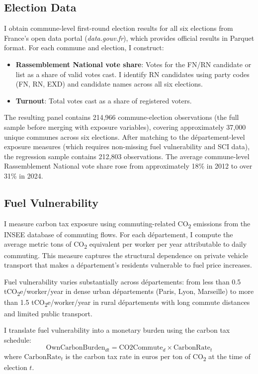 \documentclass[12pt]{article}
\newcommand{\rn}{Rassemblement National}
\newcommand{\dept}{d\'{e}partement}
\newcommand{\depts}{d\'{e}partements}
\begin{document}
\subsection{Election Data}

I obtain commune-level first-round election results for all six elections from France's open data portal (\textit{data.gouv.fr}), which provides official results in Parquet format. For each commune and election, I construct:
\begin{itemize}
    \item \textbf{\rn{} vote share}: Votes for the FN/RN candidate or list as a share of valid votes cast. I identify RN candidates using party codes (FN, RN, EXD) and candidate names across all six elections.
    \item \textbf{Turnout}: Total votes cast as a share of registered voters.
\end{itemize}

The resulting panel contains 214,966 commune-election observations (the full sample before merging with exposure variables), covering approximately 37,000 unique communes across six elections. After matching to the \dept{}-level exposure measures (which requires non-missing fuel vulnerability and SCI data), the regression sample contains 212,803 observations. The average commune-level \rn{} vote share rose from approximately 18\% in 2012 to over 31\% in 2024.

\subsection{Fuel Vulnerability}

I measure carbon tax exposure using commuting-related CO\textsubscript{2} emissions from the INSEE database of commuting flows. For each \dept{}, I compute the average metric tons of CO\textsubscript{2} equivalent per worker per year attributable to daily commuting. This measure captures the structural dependence on private vehicle transport that makes a \dept{}'s residents vulnerable to fuel price increases.

Fuel vulnerability varies substantially across \depts{}: from less than 0.5 tCO\textsubscript{2}e/worker/year in dense urban \depts{} (Paris, Lyon, Marseille) to more than 1.5 tCO\textsubscript{2}e/worker/year in rural \depts{} with long commute distances and limited public transport.

I translate fuel vulnerability into a monetary burden using the carbon tax schedule:
\begin{equation}
\text{OwnCarbonBurden}_{dt} = \text{CO2Commute}_d \times \text{CarbonRate}_t
\end{equation}
where $\text{CarbonRate}_t$ is the carbon tax rate in euros per ton of CO\textsubscript{2} at the time of election $t$.
\end{document}
